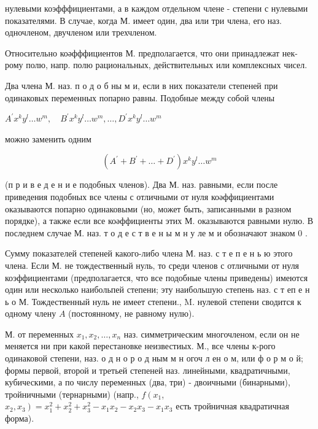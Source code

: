 \documentclass[10pt]{article}
\begin{document}
нулевыми коэфффициентами, а в каждом отдельном члене - степени с нулевыми показателями. В случае, когда М. имеет один, два или три члена, его наз. одночленом, двучленом или трехчленом.



Относительно коәфффициентов М. предполагается, что они принадлежат нек-рому полю, напр. полю рациональных, действительных или комплексных чисел.



Два члена М. наз. п о д о б ны м и, если в них показатели степеней при одинаковых переменных попарно равны. Подобные между собой члены



$A^{\prime} x^{k} y^{l} \ldots w^{m}, \quad B^{\prime} x^{k} y^{l} \ldots w^{m}, \ldots, D^{\prime} x^{k} y^{l} \ldots w^{m}$



можно заменить одним



\[

\left(A^{\prime}+B^{\prime}+\ldots+D^{\prime}\right) x^{k} y^{l} \ldots w^{m}

\]



(п р и в е д е н и е подобных членов). Два М. наз. равными, если после приведения подобных все члены с отличными от нуля коәффициентами оказываются попарно одинаковыми (но, может быть, записанными в разном порядке), а также если все коәффициенты этих М. оказываются равными нулю. В последнем случае М. наз. т о д е с т в е н ы м н у ле м и обозначают знаком 0 .



Сумму показателей степеней какого-либо члена М. наз. с т е п е н ь ю этого члена. Если М. не тождественный нуль, то среди членов с отличными от нуля коэффициентами (предполагается, что все подобные члены приведены) имеются один или несколько наибольпей степени; эту наибольшую степень наз. с т еп е н ь о М. Тождественный нуль не имеет степени., M. нулевой степени сводится к одному члену $A$ (постоянному, не равному нулю).



М. от переменных $x_{1}, x_{2}, \ldots, x_{n}$ наз. симметрическим многочленом, если он не меняется ни при какой перестановке неизвестиых. М., все члены к-рого одинаковой степени, наз. о д н о р о д ным м н огоч л ен о м, или ф о р м о й; формы первой, второй и третьей степеней наз. линейными, квадратичными, кубическими, а по числу переменных (два, три) - двоичными (бинарными), тройничными (тернарными) (напр., $f\left(x_{1}\right.$, $\left.x_{2}, x_{3}\right)=x_{1}^{2}+x_{2}^{2}+x_{3}^{2}-x_{1} x_{2}-x_{2} x_{3}-x_{1} x_{3}$ есть тройничная квадратичная форма).
\end{document}
